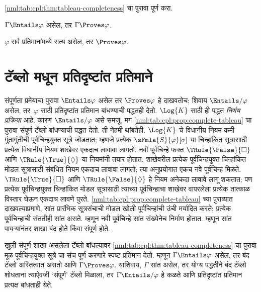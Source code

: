 \begin{prob}
\ref{nml:tab:cpl:thm:tableau-completeness} चा
पुरावा पूर्ण करा.
\end{prob}

\begin{cor}
\label{nml:tab:cpl:cor:entailment-completeness}
$\Gamma \Entails \varphi$ असेल, तर
$\Gamma \Proves \varphi$.
\end{cor}

\begin{cor}
\label{nml:tab:cpl:cor:weak-completeness}
$\varphi$ सर्व प्रतिमानांमध्ये सत्य असेल,
तर $\Proves \varphi$.
\end{cor}













\section{टॅब्लो मधून प्रतिदृष्टांत प्रतिमाने}\label{nml:tab:cou:sec}

\begin{explain}
  संपूर्णता प्रमेयाचा पुरावा
  $\Entails \varphi$ असेल तर $\Proves \varphi$
  हे दाखवतोच; शिवाय $\Entails/ \varphi$
  असेल, तर~$\varphi$ साठी प्रतिदृष्टांत
  प्रतिमान बांधण्याची पद्धतही देतो.
  $\Log{K}$ साठी ही पद्धत
  \emph{निर्णय प्रक्रिया} आहे. कारण
  $\Entails/ \varphi$ असे समजू. मग
  \ref{nml:tab:cpl:prop:complete-tableau} चा
  पुरावा संपूर्ण टॅब्लो बांधण्याची
  पद्धत देतो. ती नेहमी थांबतेही.
  $\Log{K}$ चे विधानीय नियम कमी गुंतागुंतीची
  पूर्वचिन्हयुक्त सूत्रे जोडतात;
  म्हणजे प्रत्येक
  $\sFmla{S}{\varphi}[\sigma]$ या चिन्हांकित
  सूत्रासाठी प्रत्येक विधानीय नियम
  शाखेवर एकदाच लावावा लागतो.
  नवी पूर्वचिन्हे फक्त
  $\TRule{\False}{\Box}$
    आणि $\TRule{\True}{\Diamond}$
  या नियमांनी
  तयार होतात. शाखेवरील प्रत्येक पूर्वचिन्हयुक्त
  चिन्हांकित मोडल सूत्रासाठी संबंधित नियम
  एकदाच लावावा लागतो; त्या अनुप्रयोगात
  एकच नवे पूर्वचिन्ह मिळते.
  $\TRule{\True}{\Box}$
    आणि $\TRule{\False}{\Diamond}$
  हे नियम
  अनेकदा लावावे लागू शकतात; पण प्रत्येक
  पूर्वचिन्हयुक्त चिन्हांकित मोडल सूत्रासाठी
  त्याच्या पूर्वचिन्हाचा शाखेवर वापरलेला प्रत्येक
  तात्काळ विस्तार घेऊन एकदाच लावणे पुरते.
  \ref{nml:tab:cpl:prop:complete-tableau} च्या पुराव्यात
  दाखवल्याप्रमाणे, सांत प्रारंभिक सूत्रसंचाची मोडल
  खोली पूर्वचिन्हांची उंची मर्यादित करते; प्रत्येक
  पूर्वचिन्हाची संततीही सांत असते. म्हणून नवी
  पूर्वचिन्हे सांत संख्येनेच निर्माण होतात. म्हणून
  सांत पायऱ्यांनंतर शाखा बंद होते किंवा
  संपूर्ण होते.

  खुली संपूर्ण शाखा असलेला टॅब्लो
  बांधल्यावर \ref{nml:tab:cpl:thm:tableau-completeness}
  चा पुरावा मूळ पूर्वचिन्हयुक्त सूत्रे
  चा संच पूर्ण करणारे स्पष्ट प्रतिमान देतो.
  म्हणून $\Gamma \Entails \varphi$ असेल, तर
  बंद टॅब्लो अस्तित्वात असतो आणि
  $\Gamma \Proves \varphi$. याशिवाय, $\Gamma$ सांत
  असेल, तर योग्य पद्धतीने बंद टॅब्लो शोधताना
  त्याऐवजी ‘संपूर्ण’ टॅब्लो मिळाला,
  तर $\Gamma \Entails/ \varphi$ हे कळते
  आणि प्रतिदृष्टांत प्रतिमान प्रत्यक्ष
  बांधताही येते.
\end{explain}


